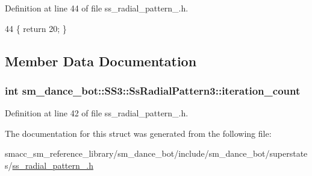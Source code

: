 Definition at line 44 of file ss\+\_\+radial\+\_\+pattern\+\_.\+h.


\begin{DoxyCode}
44 \{ \textcolor{keywordflow}{return} 20; \}
\end{DoxyCode}


\subsection{Member Data Documentation}
\subsubsection[{\texorpdfstring{iteration\+\_\+count}{iteration_count}}]{\setlength{\rightskip}{0pt plus 5cm}int sm\+\_\+dance\+\_\+bot\+::\+S\+S3\+::\+Ss\+Radial\+Pattern3\+::iteration\+\_\+count}\hypertarget{structsm__dance__bot_1_1SS3_1_1SsRadialPattern3_a62885be83defcafb3fe5237dd3ec6b4c}{}\label{structsm__dance__bot_1_1SS3_1_1SsRadialPattern3_a62885be83defcafb3fe5237dd3ec6b4c}


Definition at line 42 of file ss\+\_\+radial\+\_\+pattern\+\_.\+h.



The documentation for this struct was generated from the following file\+:\begin{DoxyCompactItemize}
\item 
smacc\+\_\+sm\+\_\+reference\+\_\+library/sm\+\_\+dance\+\_\+bot/include/sm\+\_\+dance\+\_\+bot/superstates/\hyperlink{ss__radial__pattern__3_8h}{ss\+\_\+radial\+\_\+pattern\+\_.\+h}\end{DoxyCompactItemize}
